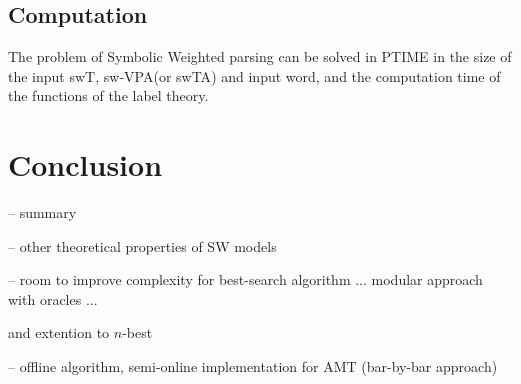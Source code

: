 \documentclass[runningheads]{llncs}
\def\SWT{\textsf{swT}\xspace}
\def\SWTA{\textsf{swTA}\xspace}
\def\SWVPA{\textsf{sw-VPA}\xspace}
\begin{document}
\subsection{Computation}

\begin{proposition}
The problem of Symbolic Weighted  parsing 
can be solved in PTIME in the size of the input \SWT, \SWVPA (or \SWTA) and input word, 
and the computation time of the functions of the label theory.
\end{proposition}
%


%




\section*{Conclusion}

\noindent
-- summary 

\noindent
-- other theoretical properties of SW models

\noindent
-- room to improve complexity for best-search algorithm
... modular approach with oracles ...

and extention to $n$-best

\noindent
-- offline algorithm, 
semi-online implementation for AMT (bar-by-bar approach)





%
% 

%






\newpage
\appendix 
\end{document}
